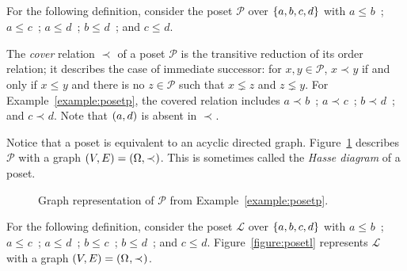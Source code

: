 \documentclass{llncs}
\DeclarePairedDelimiter{\set}{\{}{\}}
\DeclarePairedDelimiter{\tuple}{(}{)}
\let\oldleq\leq
\renewcommand{\leq}[1][]{\oldleq_{#1}}
\newcommand{\poset}[1]{\mathcal{#1}}
\newcommand{\uni}[1][]{\Omega_{#1}}
\newcommand{\covered}[1][]{\prec_{#1}}
\begin{document}
\begin{example}
    For the following definition, consider the poset $\poset{P}$ over $\set{a,b,c,d}$ with $a \leq b$\ ; $a \leq c$\ ; $a \leq d$\ ; $b \leq d$\ ; and $c \leq d$.
    \label{example:posetp}
\end{example}

The \emph{cover} relation $\covered$ of a poset $\poset{P}$ is the transitive reduction of its order relation; it describes the case of immediate successor: for $x, y \!\in\! \poset{P}$, $x \covered y$ if and only if $x \leq y$ and there is no $z \!\in\! \poset{P}$ such that $x \lneq z$ and $z \lneq y$. For Example~\ref{example:posetp}, the covered relation includes $a \covered b$\ ; $a \covered c$\ ; $b \covered d$\ ; and $c \covered d$. Note that $\tuple{a,d}$ is absent in $\covered$.

Notice that a poset is equivalent to an acyclic directed graph. Figure~\ref{figure:posetp} describes $\poset{P}$ with a graph $\tuple{V,E} = \tuple{\Omega,\covered}$. This is sometimes called the \emph{Hasse diagram} of a poset.

\begin{figure}[h]
    \centering
    \caption{Graph representation of $\poset{P}$ from Example~\ref{example:posetp}.}
    \label{figure:posetp}
\end{figure}

\begin{example}
    For the following definition, consider the poset $\poset{L}$ over $\set{a,b,c,d}$ with $a \leq b$\ ; $a \leq c$\ ; $a \leq d$\ ; $b \leq c$\ ; $b \leq d$\ ; and $c \leq d$. Figure~\ref{figure:posetl} represents $\poset{L}$ with a graph $\tuple{V,E} = \tuple{\uni,\covered}$.
    \label{example:posetl}
\end{example}
\end{document}
